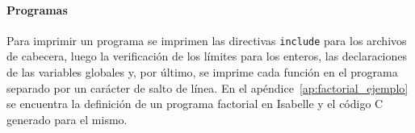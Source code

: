 \paragraph*{Programas}

Para imprimir un programa se imprimen las directivas \verb|include| para los archivos de cabecera, luego la verificación de los límites para los enteros, las declaraciones de las variables globales y, por último, se imprime cada función en el programa separado por un carácter de salto de línea.
En el apéndice~\ref{ap:factorial_ejemplo} se encuentra la definición de un programa factorial en Isabelle y el código C generado para el mismo.


\begin{comment}

apéndices

\begin{figure}
\begin{lstlisting}[mathescape=true]
  definition factorial_decl :: fun_decl
    where "factorial_decl $\equiv$
      ( fun_decl.name = fact,
        fun_decl.params = [n],
        fun_decl.locals = [r, i],
        fun_decl.body =
          r ::= (Const 1);;
          i ::= (Const 1);;
          (WHILE (Less (V i) (Plus (V n) (Const 1))) DO
            (r ::= (Mult (V r) (V i));;
            i ::= (Plus (V i) (Const 1)))
          );;
          RETURN (V r)
      )"

  definition main_decl :: fun_decl
    where "main_decl $\equiv$
      ( fun_decl.name = main,
        fun_decl.params = [],
        fun_decl.locals = [],
        fun_decl.body =
          n ::= Const 5;;
          r ::= fact ([V n])
      )"

  definition p :: program
    where "p $\equiv$
      ( program.name = fact,
        program.globals = [n, r],
        program.procs = [factorial_decl, main_decl]
      )"
\end{lstlisting}
\caption{Definición de factorial en Isabelle}
\label{fig:factorial_isabelle}
\end{figure}


\begin{figure}
\begin{lstlisting}[mathescape=true]
  #include <stdlib.h>
  #include <stdio.h>
  #include <limits.h>
  #include <stdint.h>
  #include "../test_harness.h"
  #include "../malloc_lib.h"
  #ifndef INTPTR_MIN
    #error ("Macro INTPTR_MIN undefined")
  #endif
  #ifndef INTPTR_MAX
    #error ("Macro INTPTR_MAX undefined")
  #endif
  #if ( INTPTR_MIN + 1 != -9223372036854775807 )
    #error ("Assertion INTPTR_MIN + 1 == -9223372036854775807 failed")
  #endif
  #if ( INTPTR_MAX != 9223372036854775807 )
    #error ("Assertion INTPTR_MAX == 9223372036854775807 failed")
  #endif



\end{comment}
